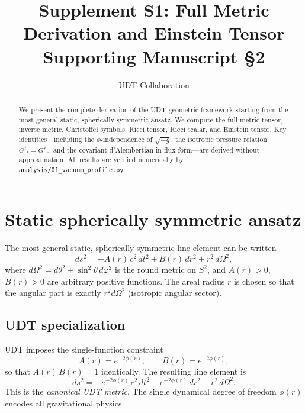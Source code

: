 \documentclass[11pt,letterpaper]{article}
\title{Supplement S1: Full Metric Derivation and Einstein Tensor \\
\large Supporting Manuscript \S2}
\author{UDT Collaboration}
\date{}
\numberwithin{equation}{section}
\begin{document}
\maketitle

\begin{abstract}
We present the complete derivation of the UDT geometric framework starting
from the most general static, spherically symmetric ansatz. We compute the
full metric tensor, inverse metric, Christoffel symbols, Ricci tensor,
Ricci scalar, and Einstein tensor. Key identities---including the
$\phi$-independence of $\sqrt{-g}$, the isotropic pressure relation
$G^t{}_t = G^r{}_r$, and the covariant d'Alembertian in flux form---are
derived without approximation. All results are verified numerically by
\texttt{analysis/01\_vacuum\_profile.py}.
\end{abstract}

\tableofcontents

\section{Static spherically symmetric ansatz}
\label{sec:ansatz}

The most general static, spherically symmetric line element can be written
\begin{equation}
\label{eq:general_sss}
  ds^2 = -A(r)\,c^2\,dt^2 + B(r)\,dr^2 + r^2\,d\Omega^2,
\end{equation}
where $d\Omega^2 = d\theta^2 + \sin^2\theta\,d\varphi^2$ is the round
metric on $S^2$, and $A(r)>0$, $B(r)>0$ are arbitrary positive functions.
The areal radius $r$ is chosen so that the angular part is exactly $r^2 d\Omega^2$
(isotropic angular sector).

\subsection{UDT specialization}

UDT imposes the single-function constraint
\begin{equation}
\label{eq:udt_constraint}
  A(r) = e^{-2\phi(r)}, \qquad B(r) = e^{+2\phi(r)},
\end{equation}
so that $A(r)\,B(r) = 1$ identically. The resulting line element is
\begin{equation}
\label{eq:metric}
\boxed{
  ds^2 = -e^{-2\phi(r)}\,c^2\,dt^2 + e^{+2\phi(r)}\,dr^2 + r^2\,d\Omega^2.
}
\end{equation}
This is the \emph{canonical UDT metric}. The single dynamical degree of
freedom $\phi(r)$ encodes all gravitational physics.
\end{document}
